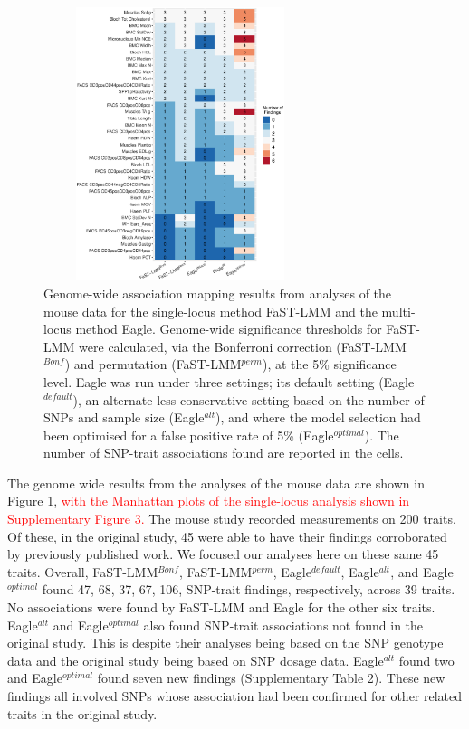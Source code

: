 \documentclass{bioinfo}
\begin{document}
\begin{figure}[!tpb]
\centerline{\includegraphics[width=8cm, height=8cm]{mouseresults.eps}}
\caption{
Genome-wide association mapping results from analyses of the mouse data for the single-locus method FaST-LMM and the 
multi-locus method Eagle. Genome-wide significance thresholds for FaST-LMM were calculated, via the Bonferroni correction 
(FaST-LMM$^{Bonf}$) and permutation (FaST-LMM$^{perm}$), at the 5\% significance level.  Eagle was run under three settings; its default setting (Eagle$^{default}$),  an alternate less conservative setting based on the number of SNPs and sample size (Eagle$^{alt}$), and where the model selection had been optimised for a false positive rate of 5\% (Eagle$^{optimal}$).   The number of SNP-trait associations found are reported in the cells. }
\label{figmouse}

\end{figure}



  
  
The genome wide results from the analyses of the mouse data are shown in Figure  \ref{figmouse}, 
\textcolor{red}{
with the Manhattan plots of the 
single-locus analysis shown in Supplementary Figure 3.} 
The mouse study recorded
measurements on 200 traits. Of these, in the original study, 45 were able to have their findings  corroborated by previously published work. We focused 
our analyses here on these same 45 traits. Overall,  FaST-LMM$^{Bonf}$,  FaST-LMM$^{perm}$, Eagle$^{default}$, Eagle$^{alt}$, and Eagle$^{optimal}$ found 47, 68, 37, 67, 106, SNP-trait findings, respectively, across 39 traits. No associations were found by FaST-LMM and Eagle for the other six traits. 
Eagle$^{alt}$ and Eagle$^{optimal}$ also found SNP-trait associations not found in the original study. This is despite their analyses being based 
on the SNP genotype data and the original study being based on SNP dosage data. Eagle$^{alt}$ found two  and 
Eagle$^{optimal}$ found seven new findings (Supplementary Table 2).  These new findings all involved SNPs whose association had been confirmed for other related traits in the original 
study. 
\end{document}
